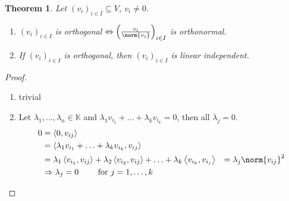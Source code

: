 \documentclass[a4paper,landscape,twocolumn]{article}
\newcommand\functional[1]{\left\langle{#1}\right\rangle}
\newtheorem{theorem}{Theorem}
\DeclarePairedDelimiter\norm\lVert\rVert
\begin{document}
\begin{theorem}
  \label{satz-8.38}
  Let $(v_i)_{i \in I} \subseteq V$, $v_i \neq 0$.
  \begin{enumerate}
    \item $(v_i)_{i \in I}$ is orthogonal $\Leftrightarrow \left(\frac{v_i}{\norm{v_i}}\right)_{i \in I}$ is orthonormal.
    \item If $(v_i)_{i \in I}$ is orthogonal, then $(v_i)_{i \in I}$ is linear independent.
  \end{enumerate}
\end{theorem}
\begin{proof}
  \begin{enumerate}
    \item trivial
    \item Let $\lambda_1, \ldots, \lambda_n \in \mathbb K$ and $\lambda_1 v_{i_1} + \ldots + \lambda_k v_{i_k} = 0$,
      then all $\lambda_j = 0$.
      \begin{align*}
        0
        &= \functional{0, v_{ij}} \\
        &= \functional{\lambda_1 v_{i_1} + \ldots + \lambda_k v_{i_k}, v_{ij}} \\
        &= \lambda_1 \functional{v_{i_1}, v_{ij}} + \lambda_2 \functional{v_{i_2}, v_{ij}} + \ldots + \lambda_k \functional{v_{i_k}, v_{i_j}}
        &= \lambda_j \norm{v_{ij}}^2 \\
        &\Rightarrow \lambda_j = 0 \qquad \text{ for } j = 1, \ldots, k
      \end{align*}
  \end{enumerate}
\end{proof}
\end{document}
